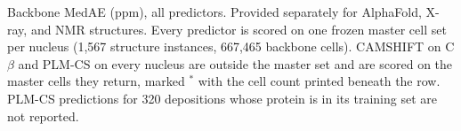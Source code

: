 Backbone MedAE (ppm), all predictors. Provided separately for AlphaFold, X-ray, and NMR structures. Every predictor is scored on one frozen master cell set per nucleus (1,567 structure instances, 667,465 backbone cells). CAMSHIFT on C$\beta$ and PLM-CS on every nucleus are outside the master set and are scored on the master cells they return, marked $^{\ast}$ with the cell count printed beneath the row. PLM-CS predictions for 320 depositions whose protein is in its training set are not reported.
